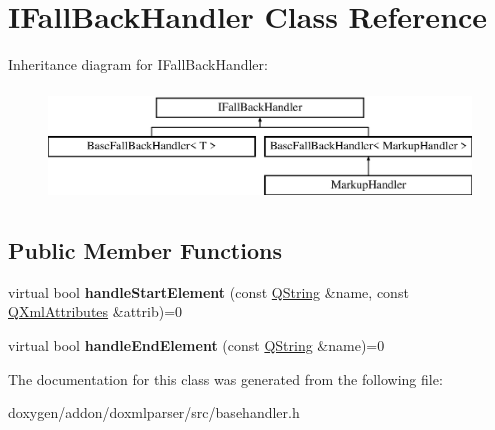 \hypertarget{class_i_fall_back_handler}{}\section{I\+Fall\+Back\+Handler Class Reference}
\label{class_i_fall_back_handler}
Inheritance diagram for I\+Fall\+Back\+Handler\+:\begin{figure}[H]
\begin{center}
\leavevmode
\includegraphics[height=3.000000cm]{class_i_fall_back_handler}
\end{center}
\end{figure}
\subsection*{Public Member Functions}
\begin{DoxyCompactItemize}
\item 
\mbox{\label{class_i_fall_back_handler_a039086a8773645a7eba55f6725966a65}} 
virtual bool {\bfseries handle\+Start\+Element} (const \mbox{\hyperlink{class_q_string}{Q\+String}} \&name, const \mbox{\hyperlink{class_q_xml_attributes}{Q\+Xml\+Attributes}} \&attrib)=0
\item 
\mbox{\label{class_i_fall_back_handler_aef41014fe1b073369f8044593ea7aad9}} 
virtual bool {\bfseries handle\+End\+Element} (const \mbox{\hyperlink{class_q_string}{Q\+String}} \&name)=0
\end{DoxyCompactItemize}


The documentation for this class was generated from the following file\+:\begin{DoxyCompactItemize}
\item 
doxygen/addon/doxmlparser/src/basehandler.\+h\end{DoxyCompactItemize}
